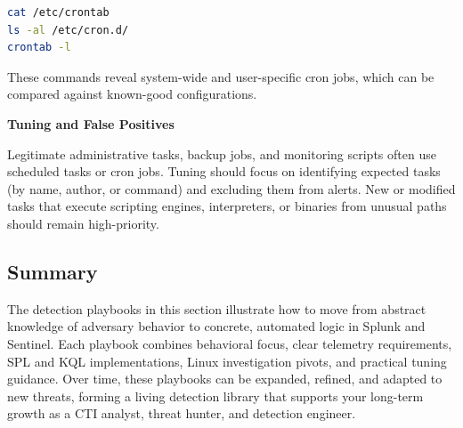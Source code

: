 \begin{lstlisting}[language=bash]
cat /etc/crontab
ls -al /etc/cron.d/
crontab -l
\end{lstlisting}

These commands reveal system-wide and user-specific cron jobs, which can be compared against known-good configurations.

\textbf{Tuning and False Positives}

Legitimate administrative tasks, backup jobs, and monitoring scripts often use scheduled tasks or cron jobs. Tuning should focus on identifying expected tasks (by name, author, or command) and excluding them from alerts. New or modified tasks that execute scripting engines, interpreters, or binaries from unusual paths should remain high-priority.

\subsection*{Summary}

The detection playbooks in this section illustrate how to move from abstract knowledge of adversary behavior to concrete, automated logic in Splunk and Sentinel. Each playbook combines behavioral focus, clear telemetry requirements, SPL and KQL implementations, Linux investigation pivots, and practical tuning guidance. Over time, these playbooks can be expanded, refined, and adapted to new threats, forming a living detection library that supports your long-term growth as a CTI analyst, threat hunter, and detection engineer.
